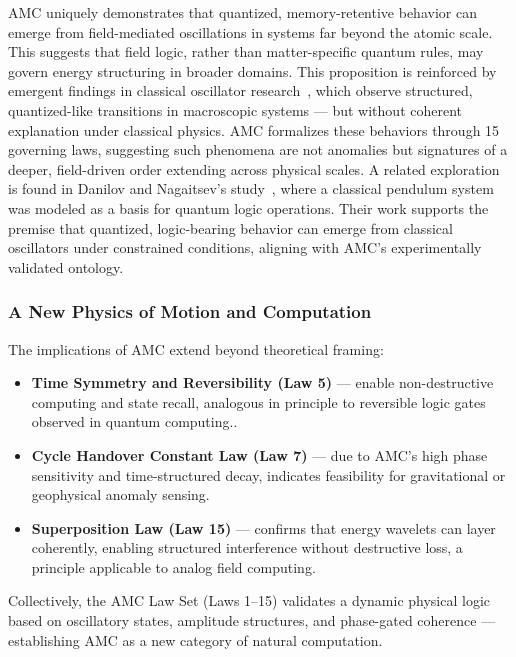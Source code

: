 \documentclass[10pt,aps,pre,onecolumn,superscriptaddress,notitlepage]{revtex4-2}
\begin{document}
AMC uniquely demonstrates that quantized, memory-retentive behavior can emerge from field-mediated oscillations in systems far beyond the atomic scale. This suggests that field logic, rather than matter-specific quantum rules, may govern energy structuring in broader domains.
This proposition is reinforced by emergent findings in classical oscillator research~\cite{timmer2024phase}, which observe structured, quantized-like transitions in macroscopic systems — but without coherent explanation under classical physics. AMC formalizes these behaviors through 15 governing laws, suggesting such phenomena are not anomalies but signatures of a deeper, field-driven order extending across physical scales.
A related exploration is found in Danilov and Nagaitsev’s study~\cite{danilov2001quantumlogic}, where a classical pendulum system was modeled as a basis for quantum logic operations. Their work supports the premise that quantized, logic-bearing behavior can emerge from classical oscillators under constrained conditions, aligning with AMC’s experimentally validated ontology.

\subsubsection{A New Physics of Motion and Computation}

The implications of AMC extend beyond theoretical framing:

\begin{itemize}
    \item \textbf{Time Symmetry and Reversibility (Law 5)} — enable non-destructive computing and state recall, analogous in principle to reversible logic gates observed in quantum computing..
    \item \textbf{Cycle Handover Constant Law (Law 7)} — due to AMC’s high phase sensitivity and time-structured decay, indicates feasibility for gravitational or geophysical anomaly sensing.
    \item \textbf{Superposition Law (Law 15)} — confirms that energy wavelets can layer coherently, enabling structured interference without destructive loss, a principle applicable to analog field computing.
\end{itemize}

Collectively, the AMC Law Set (Laws 1–15) validates a dynamic physical logic based on oscillatory states, amplitude structures, and phase-gated coherence — establishing AMC as a new category of natural computation. 
\end{document}
